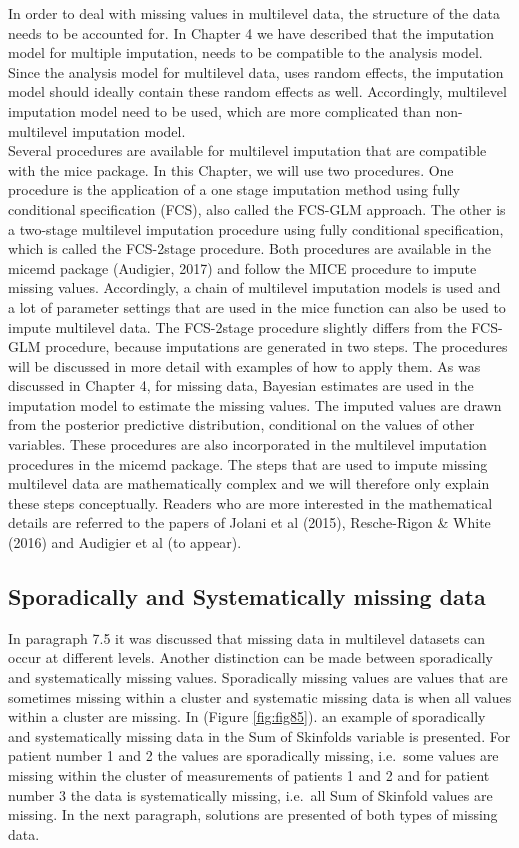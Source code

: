 \documentclass[]{book}
\begin{document}
In order to deal with missing values in multilevel data, the structure
of the data needs to be accounted for. In Chapter 4 we have described
that the imputation model for multiple imputation, needs to be
compatible to the analysis model. Since the analysis model for
multilevel data, uses random effects, the imputation model should
ideally contain these random effects as well. Accordingly, multilevel
imputation model need to be used, which are more complicated than
non-multilevel imputation model.\\
Several procedures are available for multilevel imputation that are
compatible with the mice package. In this Chapter, we will use two
procedures. One procedure is the application of a one stage imputation
method using fully conditional specification (FCS), also called the
FCS-GLM approach. The other is a two-stage multilevel imputation
procedure using fully conditional specification, which is called the
FCS-2stage procedure. Both procedures are available in the micemd
package (Audigier, 2017) and follow the MICE procedure to impute missing
values. Accordingly, a chain of multilevel imputation models is used and
a lot of parameter settings that are used in the mice function can also
be used to impute multilevel data. The FCS-2stage procedure slightly
differs from the FCS-GLM procedure, because imputations are generated in
two steps. The procedures will be discussed in more detail with examples
of how to apply them. As was discussed in Chapter 4, for missing data,
Bayesian estimates are used in the imputation model to estimate the
missing values. The imputed values are drawn from the posterior
predictive distribution, conditional on the values of other variables.
These procedures are also incorporated in the multilevel imputation
procedures in the micemd package. The steps that are used to impute
missing multilevel data are mathematically complex and we will therefore
only explain these steps conceptually. Readers who are more interested
in the mathematical details are referred to the papers of Jolani et al
(2015), Resche-Rigon \& White (2016) and Audigier et al (to appear).

\subsection{Sporadically and Systematically missing
data}\label{sporadically-and-systematically-missing-data}

In paragraph 7.5 it was discussed that missing data in multilevel
datasets can occur at different levels. Another distinction can be made
between sporadically and systematically missing values. Sporadically
missing values are values that are sometimes missing within a cluster
and systematic missing data is when all values within a cluster are
missing. In (Figure \ref{fig:fig85}). an example of sporadically and
systematically missing data in the Sum of Skinfolds variable is
presented. For patient number 1 and 2 the values are sporadically
missing, i.e.~some values are missing within the cluster of measurements
of patients 1 and 2 and for patient number 3 the data is systematically
missing, i.e.~all Sum of Skinfold values are missing. In the next
paragraph, solutions are presented of both types of missing data.
\end{document}
